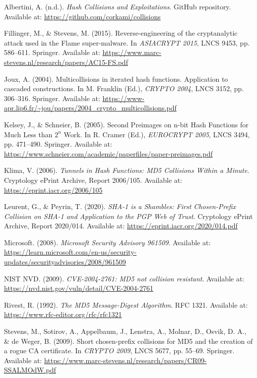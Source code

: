 \documentclass[runningheads]{llncs}
\begin{document}
    \begin{thebibliography}{99}

        Albertini, A. (n.d.). \textit{Hash Collisions and Exploitations}. GitHub repository. Available at: \url{https://github.com/corkami/collisions}

        Fillinger, M., \& Stevens, M. (2015). Reverse-engineering of the cryptanalytic attack used in the Flame super-malware. In \textit{ASIACRYPT 2015}, LNCS 9453, pp. 586--611. Springer. Available at: \url{https://www.marc-stevens.nl/research/papers/AC15-FS.pdf}

        Joux, A. (2004). Multicollisions in iterated hash functions. Application to cascaded constructions. In M. Franklin (Ed.), \textit{CRYPTO 2004}, LNCS 3152, pp. 306--316. Springer. Available at: \url{https://www-apr.lip6.fr/~jou/papers/2004_crypto_multicollisions.pdf}

        Kelsey, J., \& Schneier, B. (2005). Second Preimages on n-bit Hash Functions for Much Less than $2^n$ Work. In R. Cramer (Ed.), \textit{EUROCRYPT 2005}, LNCS 3494, pp. 471--490. Springer. Available at: \url{https://www.schneier.com/academic/paperfiles/paper-preimages.pdf}

        Klima, V. (2006). \textit{Tunnels in Hash Functions: MD5 Collisions Within a Minute}. Cryptology ePrint Archive, Report 2006/105. Available at: \url{https://eprint.iacr.org/2006/105}

        Leurent, G., \& Peyrin, T. (2020). \textit{SHA-1 is a Shambles: First Chosen-Prefix Collision on SHA-1 and Application to the PGP Web of Trust}. Cryptology ePrint Archive, Report 2020/014. Available at: \url{https://eprint.iacr.org/2020/014.pdf}

        Microsoft. (2008). \textit{Microsoft Security Advisory 961509}. Available at: \url{https://learn.microsoft.com/en-us/security-updates/securityadvisories/2008/961509}

        NIST NVD. (2009). \textit{CVE-2004-2761: MD5 not collision resistant}. Available at: \url{https://nvd.nist.gov/vuln/detail/CVE-2004-2761}

        Rivest, R. (1992). \textit{The MD5 Message-Digest Algorithm}. RFC 1321. Available at: \url{https://www.rfc-editor.org/rfc/rfc1321}

        Stevens, M., Sotirov, A., Appelbaum, J., Lenstra, A., Molnar, D., Osvik, D. A., \& de Weger, B. (2009). Short chosen-prefix collisions for MD5 and the creation of a rogue CA certificate. In \textit{CRYPTO 2009}, LNCS 5677, pp. 55--69. Springer. Available at: \url{https://www.marc-stevens.nl/research/papers/CR09-SSALMOdW.pdf}


\end{thebibliography}
\end{document}
